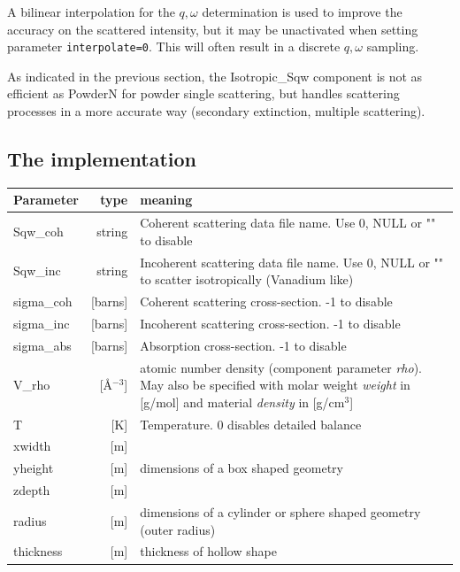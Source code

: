 A bilinear interpolation for the $q,\omega$ determination is used to improve the accuracy on the scattered intensity, but it may be unactivated when setting parameter \verb+interpolate=0+. This will often result in a discrete $q,\omega$ sampling.

As indicated in the previous section, the Isotropic\_Sqw component is not as efficient as PowderN for powder single scattering, but handles scattering processes in a more accurate way (secondary extinction, multiple scattering).

\subsection{The implementation}

\begin{table}
  \begin{center}
  {\let\my=\\
    \begin{tabular}{|lr|p{}|}
    \hline
Parameter & type & meaning \\
    \hline
Sqw\_coh   & string              & Coherent scattering data file name. Use 0, NULL or "" to disable  \\
Sqw\_inc   & string              & Incoherent scattering data file name. Use 0, NULL or "" to scatter isotropically (Vanadium like)  \\
sigma\_coh & [barns]      & Coherent scattering cross-section. -1 to disable \\
sigma\_inc & [barns]      & Incoherent scattering cross-section. -1 to disable \\
sigma\_abs & [barns]      & Absorption cross-section. -1 to disable  \\
V\_rho     & [\AA$^{-3}$] & atomic number density (component parameter \textit{rho}). May also be specified with molar weight \emph{weight} in [g/mol] and material \emph{density} in [g/cm$^3$] \\
T          & [K]          & Temperature. 0 disables detailed balance \\
    \hline
xwidth   & [m] & \\
yheight  & [m] & dimensions of a box shaped geometry \\
zdepth   & [m] & \\
radius   & [m] & dimensions of a cylinder or sphere shaped geometry (outer radius)  \\
thickness& [m] & thickness of hollow shape  \\
    \hline

\end{tabular}}
\end{center}
\end{table}

